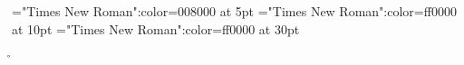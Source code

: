 \font\tctbta="Times New Roman":color=008000 at 5pt
\font\tbta="Times New Roman":color=ff0000 at 10pt
\font\ta="Times New Roman":color=ff0000 at 30pt
 \r\n
{}






\bye
